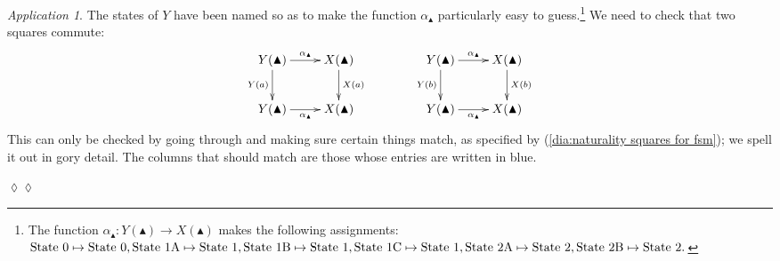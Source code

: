\documentclass{book}
\def\tn{\textnormal}
\def\to{\rightarrow}
\def\taking{\colon}
\def\monOb{\blacktriangle}
\theoremstyle{remark}
\newtheorem{app}[subsubsection]{Application}
\newenvironment{application}{\begin{app}}{\hspace*{\fill}$\lozenge\lozenge$\end{app}}
\theoremstyle{definition}
\begin{document}
\begin{application}
The states of $Y$ have been named so as to make the function $\alpha_\monOb$ particularly easy to guess.\footnote{The function $\alpha_\monOb\taking Y(\monOb)\to X(\monOb)$ makes the following assignments: $\tn{State 0}\mapsto \tn{State 0}, \tn{State 1A}\mapsto \tn{State 1}, \tn{State 1B}\mapsto \tn{State 1}, \tn{State 1C}\mapsto \tn{State 1}, \tn{State 2A}\mapsto \tn{State 2}, \tn{State 2B}\mapsto \tn{State 2}.$} We need to check that two squares commute:
\begin{align}\label{dia:naturality squares for fsm}
\xymatrix{Y(\monOb)\ar[r]^{\alpha_\monOb}\ar[d]_{Y(a)}&X(\monOb)\ar[d]^{X(a)}\\Y(\monOb)\ar[r]_{\alpha_\monOb}&X(\monOb)
}
\hspace{.5in}
\xymatrix{Y(\monOb)\ar[r]^{\alpha_\monOb}\ar[d]_{Y(b)}&X(\monOb)\ar[d]^{X(b)}\\Y(\monOb)\ar[r]_{\alpha_\monOb}&X(\monOb)
}
\end{align}
This can only be checked by going through and making sure certain things match, as specified by (\ref{dia:naturality squares for fsm}); we spell it out in gory detail. The columns that should match are those whose entries are written in blue.


\end{application}
\end{document}
